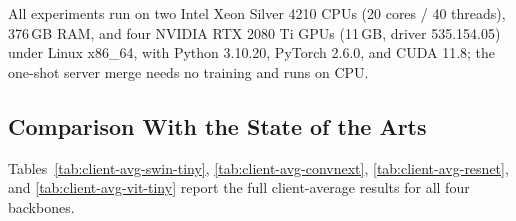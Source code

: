\documentclass[letterpaper]{article} %
\begin{document}
All experiments run on two Intel Xeon Silver 4210 CPUs (20 cores / 40 threads), 376\,GB RAM, and four NVIDIA RTX 2080 Ti GPUs (11\,GB, driver 535.154.05) under Linux x86\_64, with Python 3.10.20, PyTorch 2.6.0, and CUDA 11.8; the one-shot server merge needs no training and runs on CPU.

\subsection{Comparison With the State of the Arts}


Tables~\ref{tab:client-avg-swin-tiny}, \ref{tab:client-avg-convnext}, \ref{tab:client-avg-resnet}, and \ref{tab:client-avg-vit-tiny} report the full client-average results for all four backbones. 

\setcounter{dbltopnumber}{4}
\setcounter{topnumber}{4}
\setcounter{totalnumber}{4}
\end{document}
